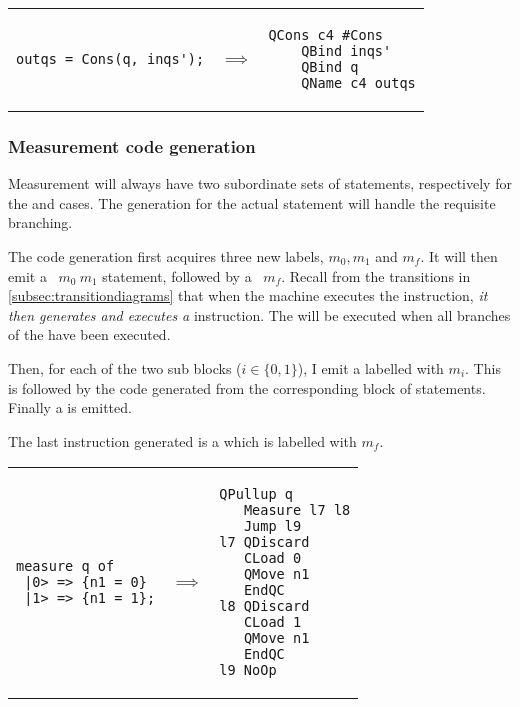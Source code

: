 \begin{center}
\begin{tabular}{p{2in}p{.3in}p{1.5in}}
{\begin{singlespace}
\begin{lstlisting}[style=linqpl]
outqs = Cons(q, inqs');
\end{lstlisting}
\end{singlespace}}
 & { \qquad \qquad \quad \quad \qquad \qquad $\implies$} &
{\begin{singlespace}
\begin{lstlisting}[style=linqpl]
    QCons c4 #Cons
    QBind inqs'
    QBind q
    QName c4 outqs
\end{lstlisting}
\end{singlespace}}
\end{tabular}
\end{center}


\subsubsection{Measurement code generation}
Measurement will always have two subordinate sets of statements,
respectively for the  and  cases. 
The generation for the actual statement will handle the requisite branching.

The code generation first acquires three new labels, $m_0,m_1$ and $m_f$. It
will then emit a ~$m_0\ m_1$ statement, followed by 
a ~$m_f$. Recall from the transitions 
in \vref{subsec:transitiondiagrams} that when the machine executes
the  instruction, \emph{it then generates and executes a}
 instruction. The  will be executed when 
all branches of the \qbit{} have been executed.

Then, for each of the two sub blocks ($i\in\{0,1\}$), 
I emit a  labelled with $m_i$. This is followed by the 
code generated from the corresponding block of statements. Finally a 
 is emitted.

The last instruction generated is a  which is labelled
with $m_f$.


\begin{center}
\begin{tabular}{p{2in}p{.3in}p{1.5in}}
{\begin{singlespace}
\begin{lstlisting}[style=linqpl]
measure q of 
 |0> => {n1 = 0}
 |1> => {n1 = 1};
\end{lstlisting}
\end{singlespace}}
 & { \qquad \qquad \quad \quad \qquad \qquad $\implies$} &
{\begin{singlespace}
\begin{lstlisting}[style=linqpl]
   QPullup q
   Measure l7 l8
   Jump l9
l7 QDiscard
   CLoad 0
   QMove n1
   EndQC 
l8 QDiscard
   CLoad 1
   QMove n1
   EndQC 
l9 NoOp
\end{lstlisting}
\end{singlespace}}
\end{tabular}
\end{center}


